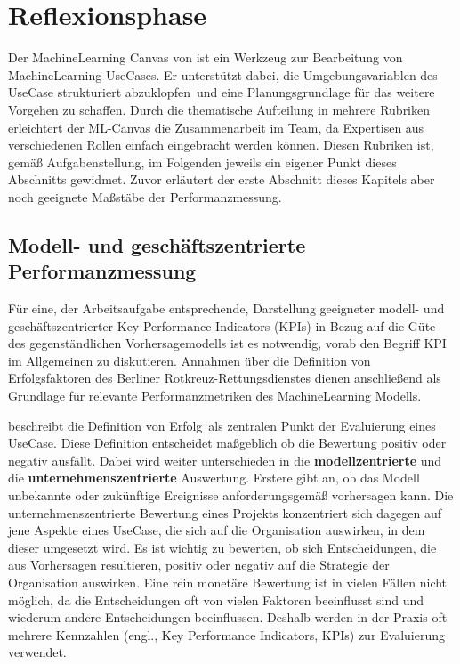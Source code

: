 \chapter{Reflexionsphase}


Der MachineLearning Canvas von \citet{dorard_machine_2022} ist ein Werkzeug zur Bearbeitung von MachineLearning UseCases. Er unterstützt dabei, die Umgebungsvariablen des UseCase strukturiert \glqq abzuklopfen\grqq\ und eine Planungsgrundlage für das weitere Vorgehen zu schaffen. Durch die thematische Aufteilung in mehrere Rubriken erleichtert der ML-Canvas die Zusammenarbeit im Team, da Expertisen aus verschiedenen Rollen einfach eingebracht werden können. Diesen Rubriken ist, gemäß Aufgabenstellung, im Folgenden jeweils ein eigener Punkt dieses Abschnitts gewidmet. Zuvor erläutert der erste Abschnitt dieses Kapitels aber noch geeignete Maßstäbe der Performanzmessung. 

\section{Modell- und geschäftszentrierte Performanzmessung}
Für eine, der Arbeitsaufgabe entsprechende, Darstellung geeigneter modell- und geschäftszentrierter Key Performance Indicators (KPIs) in Bezug auf die Güte des gegenständlichen Vorhersagemodells ist es notwendig, vorab den Begriff KPI im Allgemeinen zu diskutieren. Annahmen über die Definition von Erfolgsfaktoren des Berliner Rotkreuz-Rettungsdienstes dienen anschließend als Grundlage für relevante Performanzmetriken des MachineLearning Modells.

\cite{hes_use_2022} beschreibt die Definition von \glqq Erfolg\grqq\ als zentralen Punkt der Evaluierung eines UseCase. Diese Definition entscheidet maßgeblich ob die Bewertung positiv oder negativ ausfällt. Dabei wird weiter unterschieden in die \textbf{modellzentrierte} und die \textbf{unternehmenszentrierte} Auswertung.  Erstere gibt an, ob das Modell unbekannte oder zukünftige Ereignisse anforderungsgemäß vorhersagen kann. 
Die unternehmenszentrierte Bewertung eines Projekts konzentriert sich dagegen auf jene Aspekte eines UseCase, die sich auf die Organisation auswirken, in dem dieser umgesetzt wird.  Es ist wichtig zu bewerten, ob sich Entscheidungen, die aus Vorhersagen resultieren, positiv oder negativ auf die Strategie der Organisation auswirken. Eine rein monetäre Bewertung ist in vielen Fällen nicht möglich, da die Entscheidungen oft von vielen Faktoren beeinflusst sind und wiederum andere Entscheidungen beeinflussen. Deshalb werden in der Praxis oft mehrere Kennzahlen (engl., Key Performance Indicators, KPIs) zur Evaluierung verwendet. \citep[S.62]{hes_use_2022}

